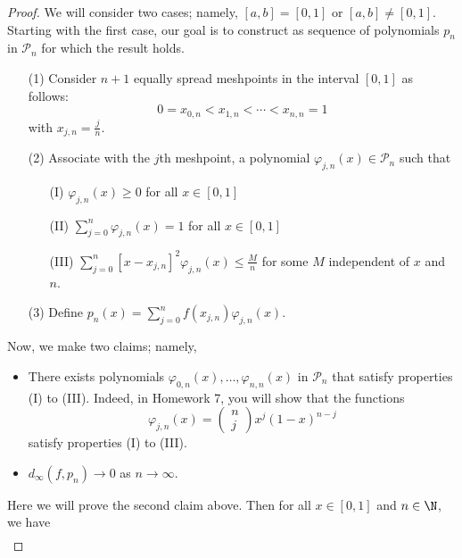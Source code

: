 \begin{proof}
    We will consider two cases; namely, \( [a,b] = [0,1] \) or \( [a,b] \neq [0,1] \). Starting with the first case, our goal is to construct as sequence of polynomials \( {p}_{n} \) in \( {\mathcal{P}}_{n} \) for which the result holds. 
    \begin{enumerate}
        \item[(1)] Consider \( n + 1  \) equally spread meshpoints in the interval \( [0,1] \) as follows:
            \[  0  = {x}_{0,n} < {x}_{1,n} < \cdots < {x}_{n,n} = 1  \]
            with \( {x}_{j,n} = \frac{ j  }{ n }  \).
        \item[(2)] Associate with the \( j \)th meshpoint, a polynomial \( \varphi_{j,n}(x) \in {\mathcal{P}}_{n} \) such that 
            \begin{enumerate}
                \item[(I)] \( {\varphi}_{j,n}(x) \geq 0  \) for all \( x \in [0,1] \) 
                \item[(II)] \( \displaystyle \sum_{ j = 0  }^{ n } {\varphi}_{j,n}(x) = 1  \) for all \( x \in [0,1] \)
                \item[(III)] \( \displaystyle \sum_{ j=0  }^{ n } [x - {x}_{j,n}]^{2} {\varphi}_{j,n}(x) \leq \displaystyle \frac{ M }{ n } \) for some \( M  \) independent of \( x  \) and \( n  \).
            \end{enumerate}
        \item[(3)] Define \( {p}_{n}(x) = \displaystyle \sum_{ j = 0  }^{ n } f({x}_{j,n}) {\varphi}_{j,n} (x)   \).
    \end{enumerate}
    Now, we make two claims; namely, 
    \begin{itemize}
        \item There exists polynomials \( {\varphi}_{0,n}(x), \dots, {\varphi}_{n,n}(x) \) in \( {\mathcal{P}}_{n} \) that satisfy properties (I) to (III). Indeed, in Homework 7, you will show that the functions
            \[ {\varphi}_{j,n}(x) = \begin{pmatrix} n \\ j  \end{pmatrix}  x^{j} (1 - x )^{n-j}  \]
            satisfy properties (I) to (III).
        \item \( {d}_{\infty}(f, {p}_{n}) \to 0  \) as \( n \to \infty   \). 
    \end{itemize}
    Here we will prove the second claim above. Then for all \( x \in [0,1] \) and \( n \in \N \), we have 
    \begin{align*}

\end{align*}
\end{proof}
